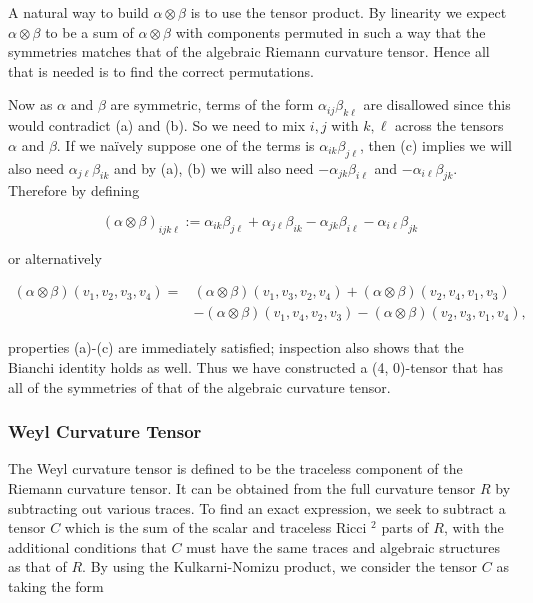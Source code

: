 \documentclass[10pt, letterpaper]{article}
\begin{document}
A natural way to build $\alpha \otimes \beta$ is to use the tensor product. By linearity we expect $\alpha \otimes \beta$ to be a sum of $\alpha \otimes \beta$ with components permuted in such a way that the symmetries matches that of the algebraic Riemann curvature tensor. Hence all that is needed is to find the correct permutations.

Now as $\alpha$ and $\beta$ are symmetric, terms of the form $\alpha_{i j} \beta_{k \ell}$ are disallowed since this would contradict (a) and (b). So we need to mix $i, j$ with $k, \ell$ across the tensors $\alpha$ and $\beta$. If we naïvely suppose one of the terms is $\alpha_{i k} \beta_{j \ell}$, then (c) implies we will also need $\alpha_{j \ell} \beta_{i k}$ and by (a), (b) we will also need $-\alpha_{j k} \beta_{i \ell}$ and $-\alpha_{i \ell} \beta_{j k}$. Therefore by defining

$$
(\alpha \otimes \beta)_{i j k \ell}:=\alpha_{i k} \beta_{j \ell}+\alpha_{j \ell} \beta_{i k}-\alpha_{j k} \beta_{i \ell}-\alpha_{i \ell} \beta_{j k}
$$

or alternatively

$$
\begin{aligned}
(\alpha \otimes \beta)\left(v_{1}, v_{2}, v_{3}, v_{4}\right)= & (\alpha \otimes \beta)\left(v_{1}, v_{3}, v_{2}, v_{4}\right)+(\alpha \otimes \beta)\left(v_{2}, v_{4}, v_{1}, v_{3}\right) \\
& -(\alpha \otimes \beta)\left(v_{1}, v_{4}, v_{2}, v_{3}\right)-(\alpha \otimes \beta)\left(v_{2}, v_{3}, v_{1}, v_{4}\right),
\end{aligned}
$$

properties (a)-(c) are immediately satisfied; inspection also shows that the Bianchi identity holds as well. Thus we have constructed a (4, 0)-tensor that has all of the symmetries of that of the algebraic curvature tensor.

\subsubsection*{Weyl Curvature Tensor}
The Weyl curvature tensor is defined to be the traceless component of the Riemann curvature tensor. It can be obtained from the full curvature tensor $R$ by subtracting out various traces. To find an exact expression, we seek to subtract a tensor $C$ which is the sum of the scalar and traceless Ricci ${ }^{2}$ parts of $R$, with the additional conditions that $C$ must have the same traces and algebraic structures as that of $R$. By using the Kulkarni-Nomizu product, we consider the tensor $C$ as taking the form
\end{document}
